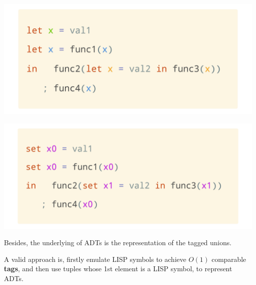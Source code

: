 \documentclass[a1,portrait]{a1poster}
\begin{document}
\begin{multicols}{2}
\begin{multicols}{2}
\begin{minipage}[b]{1\linewidth}
\begin{center}\vspace{0.1cm}
    \includegraphics[width=0.9\linewidth]{figs/let-occur.png}
\end{center}\vspace{0.1cm}
\end{minipage}

\begin{minipage}[b]{1\linewidth}
\begin{center}\vspace{0.1cm}
    \includegraphics[width=0.9\linewidth]{figs/let-realloc.png}
\end{center}\vspace{0.1cm}
\end{minipage}
\end{multicols}

Besides, the underlying of ADTs is the representation of the tagged unions.

A valid approach is, firstly emulate LISP symbols to achieve $O(1)$ comparable \textbf{tags},
and then use tuples whose 1st element is a LISP symbol, to represent ADTs.
\begin{multicols}{2}


\end{multicols}
\end{multicols}
\end{document}
